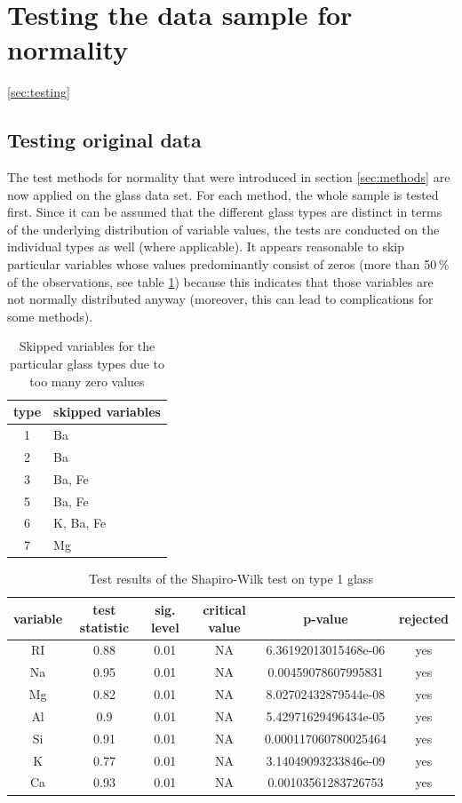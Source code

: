 \documentclass[a4paper, 12pt, titlepage, headsepline, listof = totoc, bibliography = totoc, numbers = noenddot]{scrartcl}
\begin{document}
\newpage
\section{Testing the data sample for normality}\ref{sec:testing}

\subsection{Testing original data}


The test methods for normality that were introduced in section \ref{sec:methods} are now applied on the glass data set. For each method, the whole sample is tested first. Since it can be assumed that the different glass types are distinct in terms of the underlying distribution of variable values, the tests are conducted on the individual types as well (where applicable). It appears reasonable to skip particular variables whose values predominantly consist of zeros (more than 50\,\% of the observations, see table \ref{tab:zeros}) because this indicates that those variables are not normally distributed anyway (moreover, this can lead to complications for some methods).

\begin{table}[h!]
\centering
\begin{tabular}{|cl|}
\hline
type & skipped variables\\
\hline
1 & Ba\\
2 & Ba\\
3 & Ba, Fe\\
5 & Ba, Fe\\
6 & K, Ba, Fe\\
7 & Mg\\
\hline
\end{tabular}
\caption{Skipped variables for the particular glass types due to too many zero values}
\label{tab:zeros}
\end{table}

\begin{table}[h!]
\centering
\begin{tabular}{|cccccc|} \hline variable & test statistic & sig. level & critical value & p-value & rejected\\ \hline RI & 0.88 & 0.01 & NA & 6.36192013015468e-06 & yes\\ 
Na & 0.95 & 0.01 & NA & 0.00459078607995831 & yes\\ 
Mg & 0.82 & 0.01 & NA & 8.02702432879544e-08 & yes\\ 
Al & 0.9 & 0.01 & NA & 5.42971629496434e-05 & yes\\ 
Si & 0.91 & 0.01 & NA & 0.000117060780025464 & yes\\ 
K & 0.77 & 0.01 & NA & 3.14049093233846e-09 & yes\\ 
Ca & 0.93 & 0.01 & NA & 0.00103561283726753 & yes\\ \hline \end{tabular}\caption{Test results of the Shapiro-Wilk test on type 1 glass}
\label{tab:testrestype1SW}
\end{table}
\end{document}
